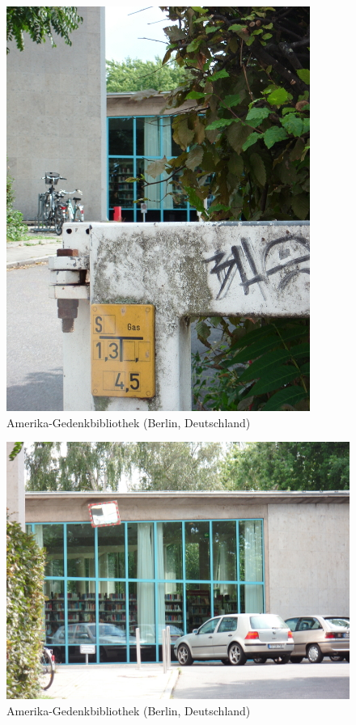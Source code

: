 \documentclass[a4paper,
fontsize=11pt,
oneside,
numbers=noperiodatend,
parskip=half-,
bibliography=totoc,
final
]{scrartcl}
\begin{document}
\begin{figure}[htbp]
\centering
\includegraphics{./img/023.jpg}
\caption{Amerika-Gedenkbibliothek (Berlin,
Deutschland)}
\end{figure}

\begin{figure}[htbp]
\centering
\includegraphics{./img/024.jpg}
\caption{Amerika-Gedenkbibliothek (Berlin,
Deutschland)}
\end{figure}
\end{document}
